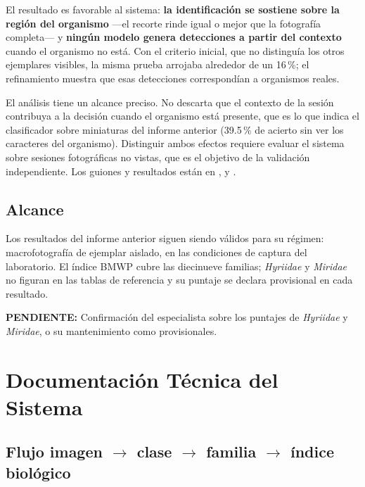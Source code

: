 \documentclass[onecolumn]{article}
\newcommand{\pendiente}[1]{\colorbox{yellow!40}{\parbox{0.95\linewidth}{\small\textbf{PENDIENTE:} #1}}}
\begin{document}
El resultado es favorable al sistema: \textbf{la identificación se sostiene sobre la región del organismo} ---el recorte rinde igual o mejor que la fotografía completa--- y \textbf{ningún modelo genera detecciones a partir del contexto} cuando el organismo no está. Con el criterio inicial, que no distinguía los otros ejemplares visibles, la misma prueba arrojaba alrededor de un 16\,\%; el refinamiento muestra que esas detecciones correspondían a organismos reales.

El análisis tiene un alcance preciso. No descarta que el contexto de la sesión contribuya a la decisión cuando el organismo está presente, que es lo que indica el clasificador sobre miniaturas del informe anterior (39.5\,\% de acierto sin ver los caracteres del organismo). Distinguir ambos efectos requiere evaluar el sistema sobre sesiones fotográficas no vistas, que es el objetivo de la validación independiente. Los guiones y resultados están en ,  y .

\subsection{Alcance}

Los resultados del informe anterior siguen siendo válidos para su régimen: macrofotografía de ejemplar aislado, en las condiciones de captura del laboratorio. El índice BMWP cubre las diecinueve familias; \emph{Hyriidae} y \emph{Miridae} no figuran en las tablas de referencia y su puntaje se declara provisional en cada resultado.

\pendiente{Confirmación del especialista sobre los puntajes de \emph{Hyriidae} y \emph{Miridae}, o su mantenimiento como provisionales.}

\section{Documentación Técnica del Sistema}

\subsection{Flujo imagen $\rightarrow$ clase $\rightarrow$ familia $\rightarrow$ índice biológico}
\end{document}
